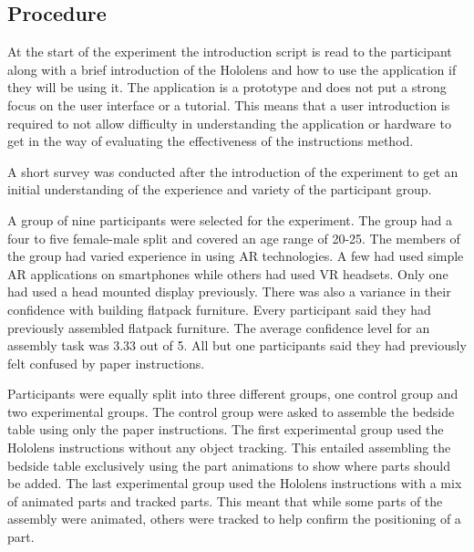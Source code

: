 \documentclass{l4proj}
\begin{document}
\subsection{Procedure}

At the start of the experiment the introduction script is read to the participant along with a brief introduction of the Hololens and how to use the application if they will be using it. The application is a prototype and does not put a strong focus on the user interface or a tutorial. This means that a user introduction is required to not allow difficulty in understanding the application or hardware to get in the way of evaluating the effectiveness of the instructions method.

A short survey was conducted after the introduction of the experiment to get an initial understanding of the experience and variety of the participant group.

A group of nine participants were selected for the experiment. The group had a four to five female-male split and covered an age range of 20-25. The members of the group had varied experience in using AR technologies. A few had used simple AR applications on smartphones while others had used VR headsets. Only one had used a head mounted display previously. There was also a variance in their confidence with building flatpack furniture. Every participant said they had previously assembled flatpack furniture. The average confidence level for an assembly task was 3.33 out of 5. All but one participants said they had previously felt confused by paper instructions.

Participants were equally split into three different groups, one control group and two experimental groups. The control group were asked to assemble the bedside table using only the paper instructions. The first experimental group used the Hololens instructions without any object tracking. This entailed assembling the bedside table exclusively using the part animations to show where parts should be added. The last experimental group used the Hololens instructions with a mix of animated parts and tracked parts. This meant that while some parts of the assembly were animated, others were tracked to help confirm the positioning of a part.
\end{document}
